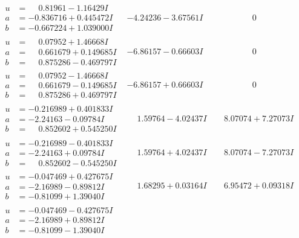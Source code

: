 \documentclass[1p]{elsarticle_modified}
\theoremstyle{definition}
\begin{document}
$$\begin{array}{c|c|c}
\begin{aligned}
u &= \phantom{-}0.81961 - 1.16429 I \\
a &= -0.836716 + 0.445472 I \\
b &= -0.667224 + 1.039000 I\end{aligned}
 & -4.24236 - 3.67561 I & \phantom{-0.000000 } 0 \\ \hline\begin{aligned}
u &= \phantom{-}0.07952 + 1.46668 I \\
a &= \phantom{-}0.661679 + 0.149685 I \\
b &= \phantom{-}0.875286 - 0.469797 I\end{aligned}
 & -6.86157 - 0.66603 I & \phantom{-0.000000 } 0 \\ \hline\begin{aligned}
u &= \phantom{-}0.07952 - 1.46668 I \\
a &= \phantom{-}0.661679 - 0.149685 I \\
b &= \phantom{-}0.875286 + 0.469797 I\end{aligned}
 & -6.86157 + 0.66603 I & \phantom{-0.000000 } 0 \\ \hline\begin{aligned}
u &= -0.216989 + 0.401833 I \\
a &= -2.24163 - 0.09784 I \\
b &= \phantom{-}0.852602 + 0.545250 I\end{aligned}
 & \phantom{-}1.59764 - 4.02437 I & \phantom{-}8.07074 + 7.27073 I \\ \hline\begin{aligned}
u &= -0.216989 - 0.401833 I \\
a &= -2.24163 + 0.09784 I \\
b &= \phantom{-}0.852602 - 0.545250 I\end{aligned}
 & \phantom{-}1.59764 + 4.02437 I & \phantom{-}8.07074 - 7.27073 I \\ \hline\begin{aligned}
u &= -0.047469 + 0.427675 I \\
a &= -2.16989 - 0.89812 I \\
b &= -0.81099 + 1.39040 I\end{aligned}
 & \phantom{-}1.68295 + 0.03164 I & \phantom{-}6.95472 + 0.09318 I \\ \hline\begin{aligned}
u &= -0.047469 - 0.427675 I \\
a &= -2.16989 + 0.89812 I \\
b &= -0.81099 - 1.39040 I\end{aligned}

\end{array}$$
\end{document}
